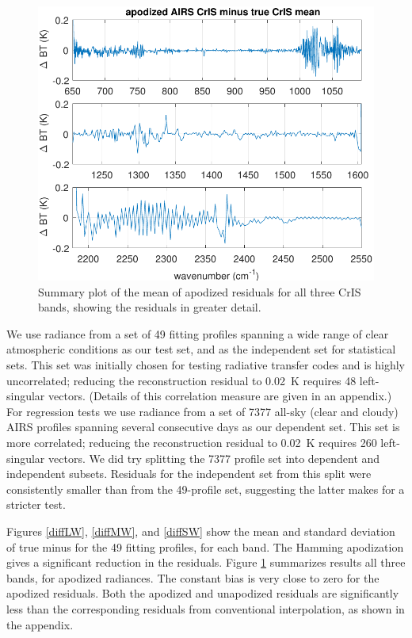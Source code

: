 \documentclass[journal]{IEEEtran}
\begin{document}
\begin{figure} %
  \centering
  \includegraphics[width=\linewidth]{figures/a2cris_diff_all.pdf}
  \caption{Summary plot of the mean of apodized residuals for all
    three CrIS bands, showing the residuals in greater detail.}
  \label{meanAll}
\end{figure}

We use radiance from a set of 49 fitting profiles spanning a wide
range of clear atmospheric conditions as our test set, and as the
independent set for statistical sets.  This set was initially chosen
for testing radiative transfer codes \cite{sarta1,sarta2} and is
highly uncorrelated; reducing the reconstruction residual to 0.02~K
requires 48 left-singular vectors.  (Details of this correlation
measure are given in an appendix.)  For regression tests we use
radiance from a set of 7377 all-sky (clear and cloudy) AIRS profiles
spanning several consecutive days as our dependent set.  This set is
more correlated; reducing the reconstruction residual to 0.02~K
requires 260 left-singular vectors.  We did try splitting the 7377
profile set into dependent and independent subsets.  Residuals for
the independent set from this split were consistently smaller than
from the 49-profile set, suggesting the latter makes for a stricter
test.


Figures \ref{diffLW}, \ref{diffMW}, and \ref{diffSW} show the mean
and standard deviation of true {\cris} minus {\airs} {\cris} for the
49 fitting profiles, for each {\cris} band.  The Hamming apodization
gives a significant reduction in the residuals.  Figure
\ref{meanAll} summarizes results all three bands, for apodized
radiances.  The constant bias is very close to zero for the apodized
residuals.  Both the apodized and unapodized residuals are
significantly less than the corresponding residuals from
conventional interpolation, as shown in the appendix.
\end{document}
